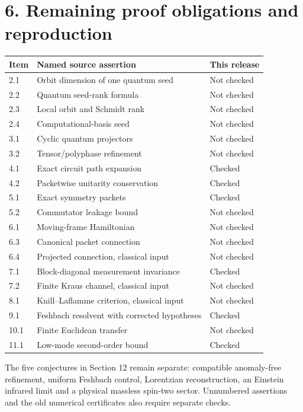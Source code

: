 \documentclass[11pt]{article}
\begin{document}
\clearpage
\section*{6. Remaining proof obligations and reproduction}
\begin{center}
\small
\begin{tabularx}{\textwidth}{@{}lXl@{}}
\toprule
Item & Named source assertion & This release\\
\midrule
2.1 & Orbit dimension of one quantum seed & Not checked\\
2.2 & Quantum seed-rank formula & Not checked\\
2.3 & Local orbit and Schmidt rank & Not checked\\
2.4 & Computational-basis seed & Not checked\\
3.1 & Cyclic quantum projectors & Not checked\\
3.2 & Tensor/polyphase refinement & Not checked\\
4.1 & Exact circuit path expansion & Checked\\
4.2 & Packetwise unitarity conservation & Checked\\
5.1 & Exact symmetry packets & Checked\\
5.2 & Commutator leakage bound & Not checked\\
6.1 & Moving-frame Hamiltonian & Not checked\\
6.3 & Canonical packet connection & Not checked\\
6.4 & Projected connection, classical input & Not checked\\
7.1 & Block-diagonal measurement invariance & Checked\\
7.2 & Finite Kraus channel, classical input & Not checked\\
8.1 & Knill--Laflamme criterion, classical input & Not checked\\
9.1 & Feshbach resolvent with corrected hypotheses & Checked\\
10.1 & Finite Euclidean transfer & Not checked\\
11.1 & Low-mode second-order bound & Checked\\
\bottomrule
\end{tabularx}
\end{center}

The five conjectures in Section 12 remain separate: compatible anomaly-free refinement, uniform Feshbach control, Lorentzian reconstruction, an Einstein infrared limit and a physical massless spin-two sector. Unnumbered assertions and the old numerical certificates also require separate checks.
\end{document}
